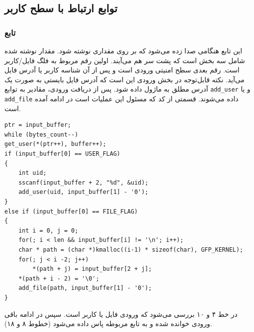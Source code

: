 \documentclass[13pt]{article}
\begin{document}
  \subsection{توابع ارتباط با سطح کاربر}
  \subsubsection{تابع }
  	این تابع هنگامی صدا زده می‌شود که بر روی 
  	 مقداری نوشته شود. مقدار نوشته شده شامل سه بخش است که پشت سر هم می‌آیند. اولین رقم مربوط به فلگ فایل/کاربر است. رقم بعدی سطح امنیتی ورودی است و پس از آن شناسه کاربر یا آدرس فایل می‌آید. نکته قابل‌توجه در بخش ورودی این است که آدرس فایل بایستی به صورت یک آدرس مطلق به ماژول داده شود. پس از دریافت ورودی، مقادیر به توابع 
  	 \texttt{add\_user}
   و یا
\texttt{add\_file}
 	  داده می‌شوند. قسمتی از کد که مسئول این عملیات است در ادامه آمده است.
 	    	\begin{latin}
 	  	\begin{lstlisting}
ptr = input_buffer;
while (bytes_count--)
get_user(*(ptr++), buffer++);
if (input_buffer[0] == USER_FLAG)
{
	int uid;
	sscanf(input_buffer + 2, "%d", &uid);
	add_user(uid, input_buffer[1] - '0');
}
else if (input_buffer[0] == FILE_FLAG)
{
	int i = 0, j = 0;
	for(; i < len && input_buffer[i] != '\n'; i++);
	char * path = (char *)kmalloc((i-1) * sizeof(char), GFP_KERNEL);
	for(; j < i -2; j++)
		*(path + j) = input_buffer[2 + j];
	*(path + i - 2) = '\0';
	add_file(path, input_buffer[1] - '0');
} \end{lstlisting}
 	  \end{latin}
   \vspace{-2\baselineskip}
   در خط ۴ و ۱۰ بررسی می‌شود که ورودی فایل یا کاربر است. سپس در ادامه باقی ورودی خوانده شده و به تابع مربوطه پاس داده می‌شود (خطوط ۸ و ۱۸).
\end{document}
